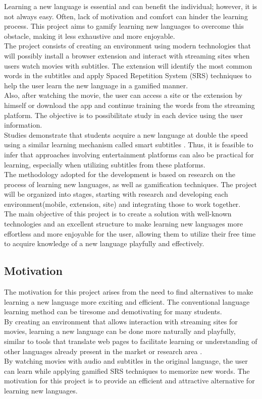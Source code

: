 \documentclass[12pt]{article}
\begin{document}
Learning a new language is essential and can benefit the individual; however, it is not always easy. Often, lack of motivation and comfort can hinder the learning process. This project aims to gamify learning new languages to overcome this obstacle, making it less exhaustive and more enjoyable. \\
The project consists of creating an environment using modern technologies that will possibly install a browser extension and interact with streaming sites when users watch movies with subtitles. The extension will identify the most common words in the subtitles and apply Spaced Repetition System (SRS) techniques to help the user learn the new language in a gamified manner. \\ 
Also, after watching the movie, the user can access a site or the extension by himself or download the app and continue training the words from the streaming platform. The objective is to possibilitate study in each device using the user information. \\ 
Studies demonstrate that students acquire a new language at double the speed using a similar learning mechanism called smart subtitles \cite{Kovacs13}. Thus, it is feasible to infer that approaches involving entertainment platforms can also be practical for learning, especially when utilizing subtitles from these platforms. \\
The methodology adopted for the development is based on research on the process of learning new languages, as well as gamification techniques. The project will be organized into stages, starting with research and developing each environment(mobile, extension, site) and integrating those to work together. \\
The main objective of this project is to create a solution with well-known technologies and an excellent structure to make learning new languages more effortless and more enjoyable for the user, allowing them to utilize their free time to acquire knowledge of a new language playfully and effectively.

\subsection{Motivation}
The motivation for this project arises from the need to find alternatives to make learning a new language more exciting and efficient. The conventional language learning method can be tiresome and demotivating for many students. \\
By creating an environment that allows interaction with streaming sites for movies, learning a new language can be done more naturally and playfully, similar to tools that translate web pages to facilitate learning or understanding of other languages already present in the market or research area \cite{ElBatanony21}. \\
By watching movies with audio and subtitles in the original language, the user can learn while applying gamified SRS techniques to memorize new words. The motivation for this project is to provide an efficient and attractive alternative for learning new languages.
\end{document}
